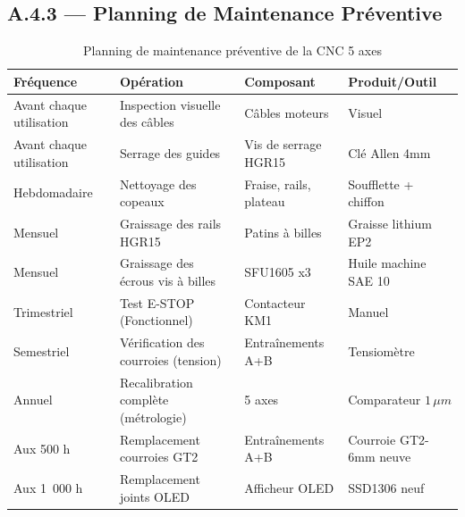 \subsection{A.4.3 — Planning de Maintenance Préventive}

\begin{table}[htbp]
\centering
\renewcommand{\arraystretch}{1.3}
\begin{tabular}{|p{2.2cm}|p{4.5cm}|p{3cm}|p{3.8cm}|}
\hline
\rowcolor{macouleur!20}
\textbf{Fréquence} & \textbf{Opération} & \textbf{Composant} & \textbf{Produit/Outil} \\
\hline
Avant chaque utilisation & Inspection visuelle des câbles & Câbles moteurs & Visuel \\
\hline
Avant chaque utilisation & Serrage des guides & Vis de serrage HGR15 & Clé Allen 4mm \\
\hline
Hebdomadaire & Nettoyage des copeaux & Fraise, rails, plateau & Soufflette + chiffon \\
\hline
Mensuel & Graissage des rails HGR15 & Patins à billes & Graisse lithium EP2 \\
\hline
Mensuel & Graissage des écrous vis à billes & SFU1605 x3 & Huile machine SAE 10 \\
\hline
Trimestriel & Test E-STOP (Fonctionnel) & Contacteur KM1 & Manuel \\
\hline
Semestriel & Vérification des courroies (tension) & Entraînements A+B & Tensiomètre \\
\hline
Annuel & Recalibration complète (métrologie) & 5 axes & Comparateur $1\,\mu m$ \\
\hline
Aux 500 h & Remplacement courroies GT2 & Entraînements A+B & Courroie GT2-6mm neuve \\
\hline
Aux 1~000 h & Remplacement joints OLED & Afficheur OLED & SSD1306 neuf \\
\hline
\end{tabular}
\caption{Planning de maintenance préventive de la CNC 5 axes}
\label{tab:maintenance}
\end{table}
